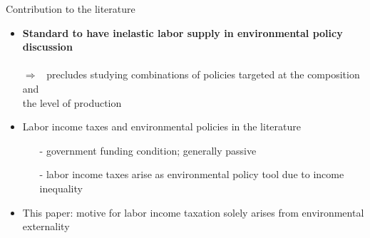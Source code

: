 \documentclass[11pt,aspectratio=169]{beamer}
\newcommand{\ar}{$\Rightarrow$ \ }
\begin{document}
\begin{frame}{Contribution to the literature}
	\begin{itemize}[<+->]
		\item \alert{\textbf{Standard to have inelastic labor supply in environmental policy discussion}}\\  \footnotesize{ \citep{Acemoglu2012TheChange, Golosov2014OptimalEquilibrium, Acemoglu2016TransitionTechnology, Fried2018ClimateAnalysis, Hart2019TheEconomists}}
		\\  \normalsize{\alert{\ar precludes studying combinations of policies targeted at the composition and\\ \hspace{5mm} the level of production }}
			\vspace{2mm}
		\item \alert{Labor income taxes and environmental policies in the literature}
		\begin{itemize}
			\item[-]  government funding condition; generally passive \footnotesize{ \citep{ LansBovenberg1994EnvironmentalTaxation, Goulder1995EnvironmentalGuide, Barrage2019OptimalPolicy}} %
			\item[-] labor income taxes arise as environmental policy tool due to {income inequality} \footnotesize{\citep{Jacobs2019RedistributionCurves, Dobkowitz2022, Douenne2022OptimalHouseholds}}
		\end{itemize}		
		\vspace{2mm}
		\item \alert{This paper}: motive for labor income taxation solely arises from environmental externality %

\end{itemize}
\end{frame}
\end{document}

